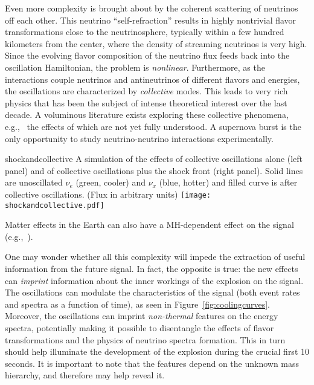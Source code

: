 Even more complexity is brought about by the coherent scattering of neutrinos off each other. This neutrino ``self-refraction'' 
 results in highly nontrivial flavor transformations close to the neutrinosphere, typically within a few hundred kilometers from the center, where the density of streaming neutrinos is very high. Since the evolving flavor composition of the neutrino flux feeds back into the oscillation Hamiltonian, the problem is \emph{nonlinear}. Furthermore, as the interactions couple neutrinos and antineutrinos of different flavors and energies, the oscillations are characterized by \emph{collective} modes.  %
This leads to very rich physics that has been the subject of intense theoretical interest over the last decade. A voluminous literature exists exploring these collective phenomena,
e.g.,~\cite{Duan:2005cp,Fogli:2007bk,Raffelt:2007cb,Raffelt:2007xt,EstebanPretel:2008ni,
Duan:2009cd,Dasgupta:2009mg,Duan:2010bg,Duan:2010bf,Wu:2014kaa} the effects of which are not yet fully understood. 
A supernova burst is the only opportunity to study neutrino-neutrino interactions experimentally.

\begin{cdrfigure}{shockandcollective}{ A simulation of the effects of collective oscillations alone (left panel) and of collective oscillations plus the shock front (right panel). Solid lines are unoscillated $\nu_e$ (green, cooler) and $\nu_x$ (blue, hotter) and filled curve is  after collective oscillations. (Flux in arbitrary units) }
\texttt{[image: shockandcollective.pdf]}
\end{cdrfigure}

Matter effects in the Earth can also have a MH-dependent effect on the signal (e.g.,~\cite{Choubey:2010up}).

One may wonder whether all this complexity will impede the extraction of useful information from the future signal. In fact, the opposite is true: the new effects can \emph{imprint} information about the inner workings of the explosion on the signal. The oscillations can modulate the characteristics of the signal (both event rates and spectra as a function of time), as seen in Figure~\ref{fig:coolingcurves}. Moreover, the oscillations can imprint \emph{non-thermal} features on the energy spectra, potentially making it possible to disentangle the effects of flavor transformations and the physics of neutrino spectra formation. This in turn should help %
illuminate the development of the explosion during the crucial first 10 seconds.   It is important to note that the features depend on the unknown mass hierarchy, and therefore may help reveal it. %

